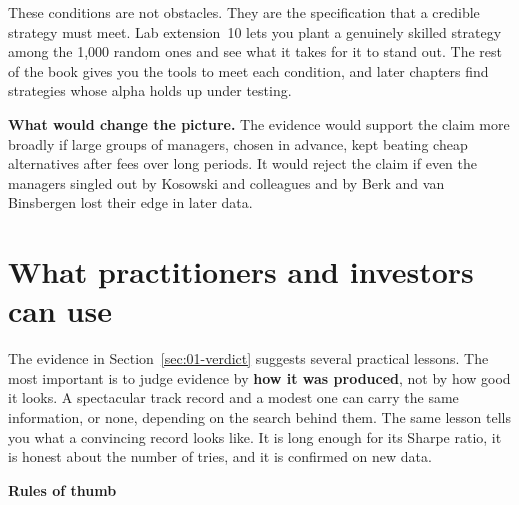 These conditions are not obstacles. They are the specification that a credible strategy must meet. Lab extension~10 lets you plant a genuinely skilled strategy among the 1,000 random ones and see what it takes for it to stand out. The rest of the book gives you the tools to meet each condition, and later chapters find strategies whose alpha holds up under testing.

\textbf{What would change the picture.} The evidence would support the claim more broadly if large groups of managers, chosen in advance, kept beating cheap alternatives after fees over long periods. It would reject the claim if even the managers singled out by Kosowski and colleagues and by Berk and van Binsbergen lost their edge in later data.

\section{What practitioners and investors can use}
\label{sec:01-investors}

The evidence in Section~\ref{sec:01-verdict} suggests several practical lessons. The most important is to judge evidence by \textbf{how it was produced}, not by how good it looks. A spectacular track record and a modest one can carry the same information, or none, depending on the search behind them. The same lesson tells you what a convincing record looks like. It is long enough for its Sharpe ratio, it is honest about the number of tries, and it is confirmed on new data.

\textbf{Rules of thumb}

